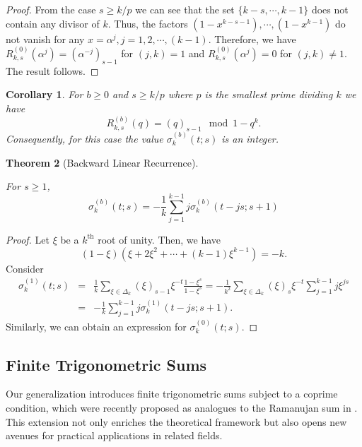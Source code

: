 \documentclass[12pt]{article}
\newtheorem{thm}{Theorem}[subsection]%
\newtheorem{cor}[thm]{Corollary}%
\begin{document}
\begin{proof}
From the case $s\geq k/p$ we can see that the set $\{k-s,\cdots,k-1\}$ does not contain any divisor of $k$. Thus, the factors $(1-x^{k-s-1}),\cdots, (1-x^{k-1})$ do not vanish for any $x=\alpha^{j}, j=1,2,\cdots,(k-1)$. Therefore, we have $R_{k,s}^{(0)}(\alpha^{j})=(\alpha^{-j})_{s-1}$ for $(j,k)=1$ and $R_{k,s}^{(0)}(\alpha^{j})=0$ for $(j,k)\neq 1$. The result follows. 
\end{proof} 

\begin{cor}
For $b\geq 0$ and $s\geq k/p$ where $p$ is the smallest prime dividing $k$ we have 
$$
R_{k,s}^{(b)}(q)=(q)_{s-1} \mod 1-q^{k}.
$$
Consequently, for this case the value $\sigma_{k}^{(b)}(t;s)$ is an integer. 
\end{cor}

\begin{thm}[Backward Linear Recurrence]\label{backward_linear_rec}

For \(s \geq 1\),
$$
\sigma_{k}^{(b)}(t;s) = -\frac{1}{k} \sum_{j=1}^{k-1} j \sigma^{(b)}_{k}(t - js; s + 1)
$$
\end{thm}
\begin{proof}
Let \(\xi\) be a \(k^{\text{th}}\) root of unity. Then, we have
$$
(1 - \xi)(\xi + 2\xi^{2} + \cdots + (k - 1)\xi^{k-1}) = -k.
$$
Consider
\begin{eqnarray}
\nonumber \sigma^{(1)}_{k}(t;s) &=& \frac{1}{k} \sum_{\xi \in \Delta_{k}} (\xi)_{s-1} \xi^{-t} \frac{1 - \xi^{s}}{1 - \xi^{s}} = -\frac{1}{k^{2}} \sum_{\xi \in \Delta_{k}} (\xi)_{s} \xi^{-t} \sum_{j=1}^{k-1} j \xi^{js} \\
\nonumber &=& -\frac{1}{k} \sum_{j=1}^{k-1} j \sigma^{(1)}_{k}(t - js; s + 1).
\end{eqnarray}
Similarly, we can obtain an expression for \(\sigma^{(0)}_{k}(t;s)\).
\end{proof}




\subsection{Finite Trigonometric Sums}

Our generalization introduces finite trigonometric sums subject to a coprime condition, which were recently proposed as analogues to the Ramanujan sum in \cite{bruce}. This extension not only enriches the theoretical framework but also opens new avenues for practical applications in related fields.
\end{document}
